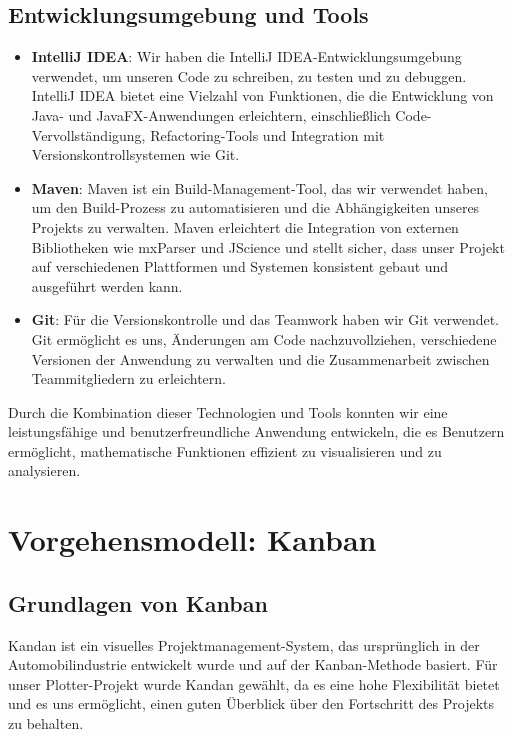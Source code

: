 \documentclass[a4paper]{article}
\begin{document}
\subsection{Entwicklungsumgebung und Tools}

\begin{itemize}
	\item \textbf{IntelliJ IDEA}: Wir haben die IntelliJ IDEA-Entwicklungsumgebung verwendet, um unseren Code zu schreiben, zu testen und zu debuggen. IntelliJ IDEA bietet eine Vielzahl von Funktionen, die die Entwicklung von Java- und JavaFX-Anwendungen erleichtern, einschließlich Code-Vervollständigung, Refactoring-Tools und Integration mit Versionskontrollsystemen wie Git.

	\item \textbf{Maven}: Maven ist ein Build-Management-Tool, das wir verwendet haben, um den Build-Prozess zu automatisieren und die Abhängigkeiten unseres Projekts zu verwalten. Maven erleichtert die Integration von externen Bibliotheken wie mxParser und JScience und stellt sicher, dass unser Projekt auf verschiedenen Plattformen und Systemen konsistent gebaut und ausgeführt werden kann.

	      \newpage

	\item \textbf{Git}: Für die Versionskontrolle und das Teamwork haben wir Git verwendet. Git ermöglicht es uns, Änderungen am Code nachzuvollziehen, verschiedene Versionen der Anwendung zu verwalten und die Zusammenarbeit zwischen Teammitgliedern zu erleichtern.
\end{itemize}

Durch die Kombination dieser Technologien und Tools konnten wir eine leistungsfähige und benutzerfreundliche Anwendung entwickeln, die es Benutzern ermöglicht, mathematische Funktionen effizient zu visualisieren und zu analysieren.

\newpage

\section{Vorgehensmodell: Kanban}
\subsection{Grundlagen von Kanban}
Kandan ist ein visuelles Projektmanagement-System, das ursprünglich in der Automobilindustrie entwickelt wurde und auf der Kanban-Methode basiert. Für unser Plotter-Projekt wurde Kandan gewählt, da es eine hohe Flexibilität bietet und es uns ermöglicht, einen guten Überblick über den Fortschritt des Projekts zu behalten.
\end{document}
